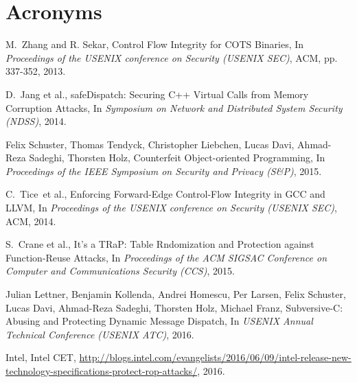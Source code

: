 \documentclass[11pt,a4paper,bibtotoc,idxtotoc,headsepline,footsepline,footexclude,BCOR12mm,DIV13]{scrbook}
\begin{document}
		
		
		
   \chapter*{Acronyms}
   
  
   \listoffigures
   \listoftables

  \clearemptydoublepage
  
  
\begin{thebibliography}{50}



M.~Zhang and R. Sekar, {Control Flow Integrity for COTS Binaries}, In
\emph{Proceedings of the USENIX conference on Security (USENIX SEC)}, ACM, pp. 337-352, 2013.

D.~Jang et al., {safeDispatch: Securing C++ Virtual Calls from Memory Corruption Attacks}, In
\emph{Symposium on Network and Distributed System Security (NDSS)}, 2014.

Felix Schuster, Thomas Tendyck, Christopher Liebchen, Lucas Davi, Ahmad-Reza Sadeghi, Thorsten Holz, 
{Counterfeit Object-oriented Programming}, In
\emph{Proceedings of the IEEE Symposium on Security and Privacy (S\&P)}, 2015.

C.~Tice~et al., {Enforcing Forward-Edge Control-Flow Integrity in GCC and LLVM}, In
\emph{Proceedings of the USENIX conference on Security (USENIX SEC)}, ACM, 2014.

S.~Crane et al., {It's a TRaP: Table Rndomization and Protection against Function-Reuse Attacks}, In
\emph{Proceedings of the ACM SIGSAC Conference on Computer and Communications Security (CCS)}, 2015.

Julian Lettner, Benjamin Kollenda, Andrei Homescu, Per Larsen, Felix Schuster,
Lucas Davi, Ahmad-Reza Sadeghi, Thorsten Holz, Michael Franz,
{Subversive-C: Abusing and Protecting Dynamic Message Dispatch}, In
\emph{USENIX Annual Technical Conference (USENIX ATC)}, 2016.

Intel,
{Intel CET}, 
\url{http://blogs.intel.com/evangelists/2016/06/09/intel-release-new-technology-specifications-protect-rop-attacks/}, 2016.


\end{thebibliography}
\end{document}

